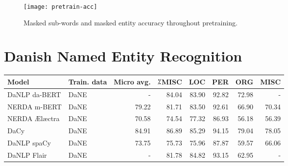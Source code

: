 \documentclass[main.tex]{subfiles}
\begin{document}
\begin{figure}[H]
    \centering
    \texttt{[image: pretrain-acc]}
    \caption{Masked sub-words and masked entity accuracy throughout pretraining.}
    \label{fig:pretrain-acc}
\end{figure}\noindent

\section{Danish Named Entity Recognition}%
\label{sec:nerres}
\begin{table}
        \begin{center}                     
                \begin{tabular}{l l r r r r r r}                                                                                                                                                                                        
                        Model & Train. data & Micro avg. & ⁒MISC & LOC & PER & ORG & MISC \\                                                                                                                                          
                        \hline                                                                                                                                                                                                          
                        DaNLP da-BERT & DaNE & - & 84.04 & 83.90 & 92.82 & 72.98 & - \\                                                                                                                                                 
                        NERDA m-BERT & DaNE & 79.22 & 81.71 & 83.50 & 92.61 & 66.90 & 70.34 \\                                                                                                                                          
                        NERDA Ælæctra & DaNE & 70.58 & 74.54 & 77.32 & 86.93 & 56.18 & 56.39 \\                     
                        DaCy & DaNE & 84.91 & 86.89 & 85.29 & 94.15 & 79.04 & 78.05 \\                              
                        DaNLP spaCy & DaNE & 73.75 & 75.73 & 75.96 & 87.87 & 59.57 & 66.06 \\                       
                        DaNLP Flair & DaNE & - & 81.78 & 84.82 & 93.15 & 62.95 & - \\                               

\end{tabular}
\end{center}
\end{table}
\end{document}
